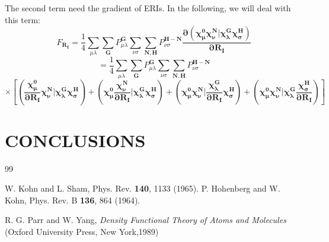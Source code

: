 \documentclass[aps,preprint,12pt]{revtex4-1}
\begin{document}
The second term need the gradient of ERIs. In the following, we will deal with this term: 
\[
 F_{\mathbf{R_I}}=\frac{1}{4}\sum_{\mu\lambda}\sum_{\mathbf{G}}P_{\mu\lambda}^{\mathbf{G}}\sum_{\nu\sigma}\sum_{\mathbf{N,H}}P_{\nu\sigma}^\mathbf{H-N}\mathbf{ \dfrac{\partial{(\chi_{\mu}^{0}\chi_{\nu}^{N}|\chi_{\lambda}^{G}\chi_{\sigma}^{H})}}{\partial{R_{I}}} }
\]
\[
 =\frac{1}{4}\sum_{\mu\lambda}\sum_{\mathbf{G}}P_{\mu\lambda}^{\mathbf{G}}\sum_{\nu\sigma}\sum_{\mathbf{N,H}}P_{\nu\sigma}^\mathbf{H-N}
\]
\begin{equation}
\times\mathbf{[ (\dfrac{\chi_{\mu}^{0}}{\partial{R_{I}}}\chi_{\nu}^{N}|\chi_{\lambda}^{G}\chi_{\sigma}^{H})
+(\chi_{\mu}^{0}\dfrac{\chi_{\nu}^{N}}{\partial{R_{I}}}|\chi_{\lambda}^{G}\chi_{\sigma}^{H}) 
+(\chi_{\mu}^{0}\chi_{\nu}^{N}|\dfrac{\chi_{\lambda}^{G}}{\partial{R_{I}}}\chi_{\sigma}^{H}) 
+(\chi_{\mu}^{0}\chi_{\nu}^{N}|\chi_{\lambda}^{G}\dfrac{\chi_{\sigma}^{H}}{\partial{R_{I}}})   ]}
\end{equation}




\section{CONCLUSIONS}

\begin{acknowledgments}

\end{acknowledgments}


\begin{thebibliography} {99}


 W. Kohn and L. Sham, Phys. Rev. {\bf 140}, 1133 (1965).
 P. Hohenberg and W. Kohn, Phys. Rev. B {\bf 136}, 864 (1964).

 R. G. Parr and W. Yang, \emph{Density Functional Theory of Atoms and Molecules }(Oxford University Press, New York,1989)

\end{thebibliography}
\end{document}
